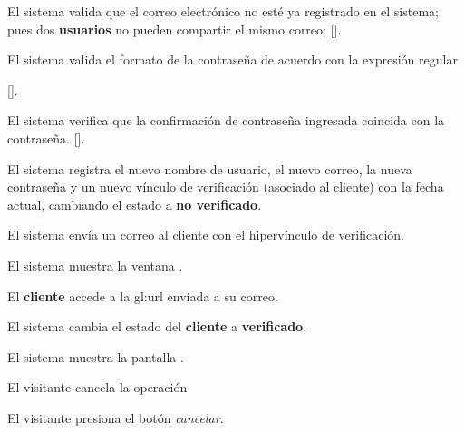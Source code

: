{\begin{trayectoriaPrincipal}
    \item El sistema valida que el correo electrónico no esté ya
      registrado en el sistema; pues dos \textbf{usuarios} no pueden
      compartir el mismo correo;
      [].

    \item El sistema valida el formato de la contraseña de acuerdo con
      la expresión regular


      [].

    \item El sistema verifica que la confirmación de contraseña
      ingresada coincida con la contraseña.
      [].

    \item El sistema registra el nuevo nombre de usuario, el nuevo correo, la
      nueva contraseña y un nuevo vínculo de verificación (asociado al cliente)
      con la fecha actual, cambiando el estado a \textbf{no verificado}.

    \item El sistema envía un correo al cliente con el hipervínculo de
      verificación.

    \item El sistema muestra la ventana
      .

    \item El \textbf{cliente} accede a la \gls{gl:url} enviada a su
      correo.


    \item El sistema cambia el estado del \textbf{cliente} a
      \textbf{verificado}.

    \item El sistema muestra la pantalla .

  \end{trayectoriaPrincipal}


  \begin{trayectoriaAlternativa}
    {El visitante cancela la operación}

    \item El visitante presiona el botón \textit{cancelar}.


\end{trayectoriaAlternativa}}

